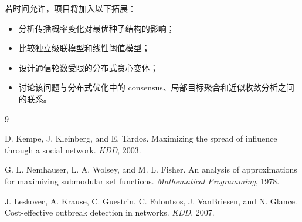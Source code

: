 \documentclass[UTF8, 11pt]{ctexart}
\begin{document}
若时间允许，项目将加入以下拓展：
\begin{itemize}
    \item 分析传播概率变化对最优种子结构的影响；
    \item 比较独立级联模型和线性阈值模型；
    \item 设计通信轮数受限的分布式贪心变体；
    \item 讨论该问题与分布式优化中的 consensus、局部目标聚合和近似收敛分析之间的联系。
\end{itemize}

\begin{thebibliography}{9}

D. Kempe, J. Kleinberg, and E. Tardos.
\newblock Maximizing the spread of influence through a social network.
\newblock \emph{KDD}, 2003.

G. L. Nemhauser, L. A. Wolsey, and M. L. Fisher.
\newblock An analysis of approximations for maximizing submodular set functions.
\newblock \emph{Mathematical Programming}, 1978.

J. Leskovec, A. Krause, C. Guestrin, C. Faloutsos, J. VanBriesen, and N. Glance.
\newblock Cost-effective outbreak detection in networks.
\newblock \emph{KDD}, 2007.

\end{thebibliography}
\end{document}
